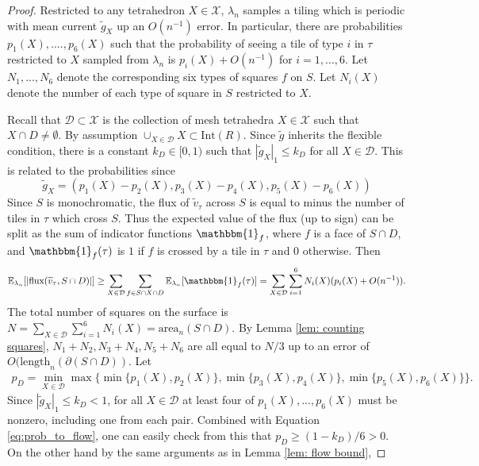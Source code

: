 \documentclass[11pt]{article}
\theoremstyle{remark}
\theoremstyle{definition}
\newcommand{\mc}[1]{\mathcal{#1}}
\newcommand{\m}[1]{\mathbb{#1}}
\begin{document}
\begin{proof}
    Restricted to any tetrahedron $X\in \mc X$, $\lambda_n$ samples a tiling which is periodic with mean current $\widetilde g_X$ up an $O(n^{-1})$ error. In particular, there are probabilities $p_1(X),....,p_6(X)$ such that the probability of seeing a tile of type $i$ in $\tau$ restricted to $X$ sampled from $\lambda_n$ is $p_i(X) +O(n^{-1})$ for $i=1,...,6$. Let $N_1,...,N_6$ denote the corresponding six types of squares $f$ on $S$. Let $N_i(X)$ denote the number of each type of square in $S$ restricted to $X$. 
    
    Recall that $\mc D\subset \mc X$ is the collection of mesh tetrahedra $X\in \mc X$ such that $X\cap D\neq \emptyset$. By assumption $\cup_{X\in \mc D} X\subset \text{Int}(R)$. Since $\widetilde g$ inherits the flexible condition, there is a constant $k_D\in [0,1)$ such that $|\widetilde g_X|_1\leq k_D$ for all $X\in \mc D$. This is related to the probabilities since 
    \begin{equation}\label{eq:prob_to_flow}
        \widetilde g_X = (p_1(X) - p_2(X), p_3(X)-p_4(X),p_5(X)-p_6(X)) 
    \end{equation}
    Since $S$ is monochromatic, the flux of $\widetilde v_\tau$ across $S$ is equal to minus the number of tiles in $\tau$ which cross $S$. Thus the expected value of the flux (up to sign) can be split as the sum of indicator functions $\mathbbm{1}_f$, where $f$ is a face of $S \cap D$, and $\mathbbm{1}_f(\tau)$ is $1$ if $f$ is crossed by a tile in $\tau$ and $0$ otherwise. Then
    \begin{align*}
        \m E_{\lambda_n}[|\text{flux}(\widetilde v_\tau,S\cap D)|] \geq \sum_{X\in \mc D} \sum_{f\in S\cap X\cap D} \m E_{\lambda_n}[\mathbbm{1}_f(\tau)] = \sum_{X\in \mc D} \sum_{i=1}^6 N_i(X) (p_i(X) + O(n^{-1})). 
    \end{align*}
    The total number of squares on the surface is $N = \sum_{X\in \mc D}\sum_{i=1}^6 N_i(X) = \text{area}_n(S\cap D)$. By Lemma \ref{lem: counting squares}, $N_1+ N_2, N_3+N_4, N_5+N_6$ are all equal to $N/3$ up to an error of $O(\text{length}_n(\partial(S\cap D))$. Let 
    \begin{align*}
        p_D = \min_{X\in \mc D} \max \{\min\{p_1(X),p_2(X)\},\min\{p_3(X),p_4(X)\},\min\{p_5(X),p_6(X)\}\}.
    \end{align*}
    Since $|\widetilde g_X|_1 \leq k_D<1$, for all $X\in \mc D$ at least four of $p_1(X),...,p_6(X)$ must be nonzero, including one from each pair. Combined with Equation \eqref{eq:prob_to_flow}, one can easily check from this that $p_D \geq (1-k_D)/6>0$. On the other hand by the same arguments as in Lemma \ref{lem: flow bound}, 

\end{proof}
\end{document}
